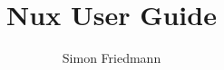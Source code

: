 \documentclass[oneside]{scrbook}
\title{Nux User Guide}
\author{Simon Friedmann}
\begin{document}
	\maketitle
    \dominitoc
    \tableofcontents

    
    
    


    
    
    
    
    
\end{document}
